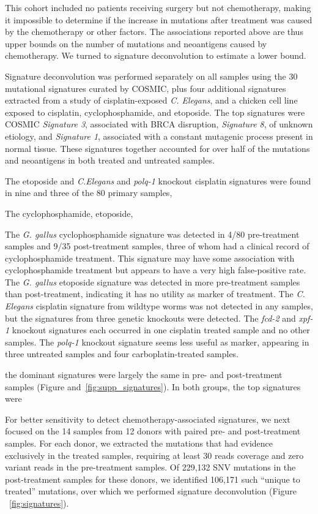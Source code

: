 This cohort included no patients receiving surgery but not chemotherapy, making it impossible to determine if the increase in mutations after treatment was caused by the chemotherapy or other factors. The associations reported above are thus upper bounds on the number of mutations and neoantigens caused by chemotherapy. We turned to signature deconvolution to estimate a lower bound.

Signature deconvolution was performed separately on all samples using the 30 mutational signatures curated by COSMIC\cite{364242}, plus four additional signatures extracted from a study of cisplatin-exposed \textit{C. Elegans}\cite{Meier_2014}, and a chicken cell line exposed to cisplatin, cyclophosphamide, and etoposide\cite{Szikriszt_2016}. The top signatures were COSMIC \textit{Signature 3}, associated with BRCA disruption, \textit{Signature 8}, of unknown etiology, and \textit{Signature 1}, associated with a constant mutagenic process present in normal tissue. These signatures together accounted for over half of the mutations and neoantigens in both treated and untreated samples.

The etoposide and \textit{C.Elegans} and \textit{polq-1} knockout cisplatin signatures were found in nine and three of the 80 primary samples, 

The cyclophosphamide, etoposide,  

The \textit{G. gallus} cyclophosphamide signature was detected in 4/80 pre-treatment samples and 9/35 post-treatment samples, three of whom had a clinical record of cyclophosphamide treatment. This signature may have some association with cyclophosphamide treatment but appears to have a very high false-positive rate. The \textit{G. gallus} etoposide signature was detected in more pre-treatment samples than post-treatment, indicating it has no utility as marker of treatment. The \textit{C. Elegans} cisplatin signature from wildtype worms was not detected in any samples, but the signatures from three genetic knockouts were detected. The \textit{fcd-2} and \textit{xpf-1} knockout signatures each occurred in one cisplatin treated sample and no other samples. The \textit{polq-1} knockout signature seems less useful as marker, appearing in three untreated samples and four carboplatin-treated samples.

 the dominant signatures were largely the same in pre- and post-treatment samples (Figure and~\ref{fig:supp_signatures}). In both groups, the top signatures were 

For better sensitivity to detect chemotherapy-associated signatures, we next focused on the 14 samples from 12 donors with paired pre- and post-treatment samples. For each donor, we extracted the mutations that had evidence exclusively in the treated samples, requiring at least 30 reads coverage and zero variant reads in the pre-treatment samples. Of 229,132 SNV mutations in the post-treatment samples for these donors, we identified 106,171 such ``unique to treated'' mutations, over which we performed signature deconvolution (Figure ~\ref{fig:signatures}).


